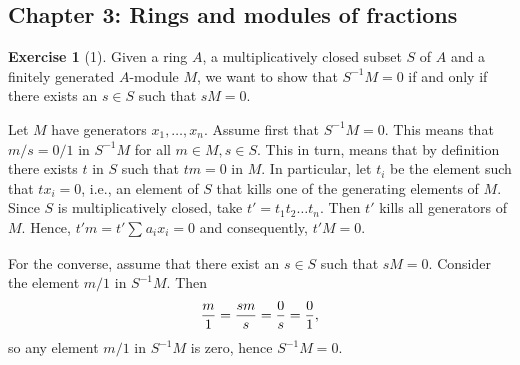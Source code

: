 \documentclass{article}
\theoremstyle{definition}
\newtheorem*{exercise}{Exercise}
\begin{document}
\subsection{Chapter 3: Rings and modules of fractions}
\label{sub:chapter_3}

\begin{exercise}[1]
    Given a ring $A$, a multiplicatively closed subset $S$ of $A$ and a
    finitely generated $A$-module $M$, we want to show that $S^{-1}M = 0$ if and
    only if there exists an $s \in S$ such that $sM = 0$.

    Let $M$ have generators $x_1, \ldots, x_n$. Assume first that $S^{-1}M = 0$.
    This means that $m / s = 0 / 1$ in $S^{-1}M$ for all $m \in M, s \in S$. This
    in turn, means that by definition there exists $t$ in $S$ such that $tm =
    0$ in $M$. In particular, let $t_i$ be the element such that $tx_i = 0$,
    i.e., an element of $S$ that kills one of the generating elements of $M$.
    Since $S$ is multiplicatively closed, take $t' = t_1t_2\ldots t_n$. Then
    $t'$ kills all generators of $M$. Hence, $t'm = t' \sum^{}_{} a_i x_i = 0$
    and consequently, $t'M = 0$.

    For the converse, assume that there exist an $s \in S$ such that $sM = 0$.
    Consider the element $m / 1$ in $S^{-1}M$. Then
    \begin{equation}
        \notag
        \frac{m}{1} = \frac{sm}{s} = \frac{0}{s} = \frac{0}{1},
    \end{equation}
    so any element $m / 1$ in $S^{-1}M$ is zero, hence $S^{-1}M = 0$.
\end{exercise}
\end{document}
